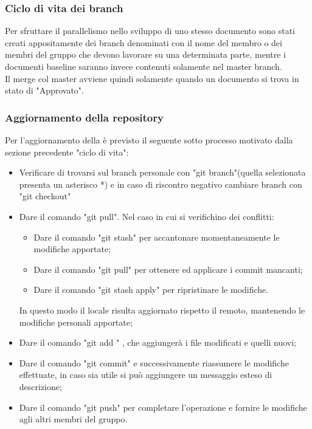 \documentclass[NormeDiProgetto.tex]{subfiles}
\begin{document}
	\subsubsection{Ciclo di vita dei branch}
	Per sfruttare il parallelismo nello sviluppo di uno stesso documento sono stati creati appositamente dei branch denominati con il nome del membro o dei membri del gruppo che devono lavorare su una determinata parte, mentre i documenti baseline saranno invece contenuti solamente nel master branch.\\
	Il merge col master avviene quindi solamente quando un documento si trova in stato di "Approvato".
	
	\subsubsection{Aggiornamento della repository}
	Per l’aggiornamento della  è previsto il seguente sotto processo motivato dalla sezione precedente "ciclo di vita":
	\begin{itemize}
		\item Verificare di trovarsi sul branch personale con "git branch"(quella selezionata presenta un asterisco *) e in caso di riscontro negativo cambiare branch con "git checkout"
		\item Dare il comando "git pull". Nel caso in cui si verifichino dei conflitti:
		\begin{itemize}
			\item Dare il comando "git stash" per accantonare momentaneamente	le modifiche apportate;
			\item Dare il comando "git pull" per ottenere ed applicare i commit mancanti;
			\item Dare il comando "git stash apply" per ripristinare le modifiche.
		\end{itemize}
		In questo modo il  locale risulta aggiornato rispetto il  remoto, mantenendo le modifiche personali apportate;
	
		\item Dare il comando "git add \textasteriskcentered" , che aggiungerà i file modificati e quelli nuovi;
		\item Dare il comando "git commit" e successivamente riassumere le modifiche effettuate, in caso sia utile si può aggiungere un messaggio esteso di descrizione;
		\item Dare il comando "git push" per completare l'operazione e fornire le modifiche agli altri membri del gruppo.
	\end{itemize}
	
\end{document}
